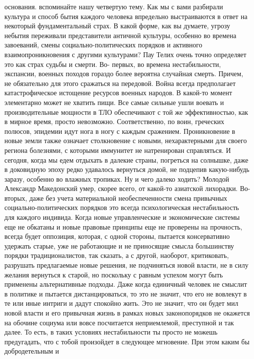 основания. вспоминайте нашу четвертую тему. Как мы с вами разбирали культура и
способ бытия каждого человека впредельно выстраиваются в ответ на некоторый
фундаментальный страх. В какой форме, как вы думаете, угрозу небытия переживали
представители античной культуры, особенно во времена завоеваний, смены
социально-политических порядков и активного взаимопроникновения с другими
культурами? Пау Телих очень точно определяет это как страх судьбы и смерти. Во-
первых, во времена нестабильности, экспансии, военных походов гораздо более
вероятна случайная смерть. Причем, не обязательно для этого сражаться на
передовой. Война всегда предполагает катастрофическое истощение ресурсов военных
народов. В какой-то момент элементарно может не хватить пищи. Все самые сильные
ушли воевать и производительные мощности в ТЛО обеспечивают с той же
эффективностью, как в мирное время, просто невозможно. Соответственно, по воин,
греческих полюсов, эпидемии идут нога в ногу с каждым сражением. Проникновение в
новые земли также означает столкновение с новыми, нехарактерными для своего
региона болезнями, с которыми иммунитет не натренирован справляться. И сегодня,
когда мы едем отдыхать в далекие страны, погреться на солнышке, даже в
доковидную эпоху редко удавалось вернуться домой, не подцепив какую-нибудь
заразу, особенно во влажных тропиках. Ну и чего далеко ходить? Молодой Александр
Македонский умер, скорее всего, от какой-то азиатской лихорадки. Во-вторых, даже
без учета материальной необеспеченности смена привычных социально-политических
порядков это всегда психологическая нестабильность для каждого индивида. Когда
новые управленческие и экономические системы еще не обкатаны и новые правовые
принципы еще не проверены на прочность, всегда будет оппозиция, которая, с одной
стороны, пытается консервативно удержать старые, уже не работающие и не
приносящие смысла большинству порядки традиционалистов, так сказать, а с другой,
наоборот, критиковать, разрушать предлагаемые новые решения, не подчиняться
новой власти, не в силу желания вернуться к старой, но поскольку с равным
успехом могут быть применены альтернативные подходы. Даже когда единичный
человек не смыслит в политике и пытается дистанцироваться, то это не значит, что
его не вовлекут в те или иные интриги и дадут спокойно жить. Это не значит, что
он будет мил новой власти и его привычная жизнь в рамках новых законопорядков не
окажется на обочине социума или вовсе посчитается неприемлемой, преступной и так
далее. То есть, в таких условиях нестабильности ты просто не можешь предугадать,
что с тобой произойдет в следующее мгновение. При этом каким бы добродетельным и

